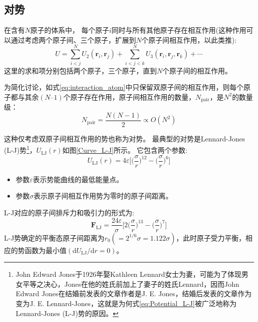 \subsection{对势}
在含有$N$原子的体系中，%
每个原子$i$同时与所有其他原子存在相互作用(这种作用可以通过考虑两个原子间、三个原子，扩展到$N$个原子间相互作用，以此类推):
\begin{equation}
	U=\sum_{i<j}^NU_2(\mathbf{r}_i,\mathbf{r}_j)+\sum_{i<j<k}^NU_3(\mathbf{r}_i,\mathbf{r}_j,\mathbf{r}_k)+\cdots
	\label{eq:interaction_atom}
\end{equation}
这里的求和项分别包括两个原子，三个原子，直到$N$个原子间的相互作用。%

为简化讨论，如式\eqref{eq:interaction_atom}中只保留双原子间的相互作用，则每个原子都与其余$(N–1)$个原子存在作用，原子间相互作用的数量，$N_{\mathrm{pair}}$，是$N^2$的数量级：
\begin{equation}
	N_{\mathrm{pair}}=\dfrac{N(N-1)}2\propto O(N^2)
	\label{eq:interaction_atom_range}
\end{equation}

这种仅考虑双原子间相互作用的势也称为对势。%
最典型的对势是\textrm{Lennard-Jones (L-J)}势\cite{PRSC106-463_1924}\footnote{\textrm{John Edward Jones}于1926年娶\textrm{Kathleen Lennard}女士为妻，可能为了体现男女平等之决心，\textrm{Jones}在他的姓氏前加上了妻子的姓氏\textrm{Lennard}，因而\textrm{John Edward Jones}在结婚前发表的文章作者是\textrm{J. E. Jones}，结婚后发表的文章作为变为{J. E. Lennard-Jones}，这就是为何式\eqref{eq:Potential_L-J}被广泛地称为\textrm{Lennard-Jones (L-J)}势的原因。}，$U_{\mathrm{LJ}}(r)$如图\ref{Curve_L-J}所示。%
它包含两个参数:~
\begin{equation}
	U_{\mathrm{LJ}}(r)=4\varepsilon\bigg[\bigg(\dfrac{\sigma}r\bigg)^{12}-\bigg(\dfrac{\sigma}r\bigg)^6\bigg]
	\label{eq:Potential_L-J}
\end{equation}
\begin{itemize}
	\item 参数$\varepsilon$表示势能曲线的最低能量点。%
	\item 参数$\sigma$表示原子间相互作用势为零时的原子间距离。
\end{itemize}
\textrm{L-J}对应的原子间排斥力和吸引力的形式为:~
\begin{equation}
	\mathbf{F}_{\mathrm{LJ}}=\dfrac{24\varepsilon}{\sigma}\bigg[2\bigg(\dfrac{\sigma}r\bigg)^{13}-\bigg(\dfrac{\sigma}r\bigg)^7\bigg]
	\label{eq:Focrce_L-J}
\end{equation}
\textrm{L-J}势确定的平衡态原子间距离为$r_0(=2^{1/6}\sigma=1.122\sigma)$，此时原子受力平衡，相应的势函数为最小值$(\mathrm{d}U_{\mathrm{LJ}}/\mathrm{d}r=0)$。

